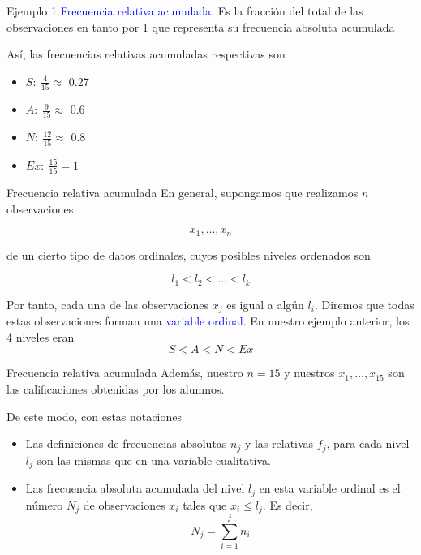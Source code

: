 \documentclass[
  ignorenonframetext,
  aspectratio=169]{beamer}
\providecommand{\tightlist}{%
  \setlength{\itemsep}{0pt}\setlength{\parskip}{0pt}}
\newcommand\blue[1]{\textcolor{blue}{#1}}
\begin{document}
\begin{frame}{Ejemplo 1}
\protect\hypertarget{ejemplo-1-3}{}
\blue{
Frecuencia relativa acumulada.
} Es la fracción del total de las observaciones en tanto por 1 que
representa su frecuencia absoluta acumulada

Así, las frecuencias relativas acumuladas respectivas son

\begin{itemize}
\tightlist
\item
  \(S:\ \frac{4}{15} \approx\) 0.27
\item
  \(A:\ \frac{9}{15}\approx\) 0.6
\item
  \(N:\ \frac{12}{15}\approx\) 0.8
\item
  \(Ex:\ \frac{15}{15}=1\)
\end{itemize}
\end{frame}

\begin{frame}{Frecuencia relativa acumulada}
\protect\hypertarget{frecuencia-relativa-acumulada}{}
En general, supongamos que realizamos \(n\) observaciones

\[x_1,\dots,x_n\]

de un cierto tipo de datos ordinales, cuyos posibles niveles ordenados
son

\[l_1<l_2<\dots<l_k\]

Por tanto, cada una de las observaciones \(x_j\) es igual a algún
\(l_i\). Diremos que todas estas observaciones forman una
\blue{variable ordinal}. En nuestro ejemplo anterior, los 4 niveles eran
\[S<A<N<Ex\]
\end{frame}

\begin{frame}{Frecuencia relativa acumulada}
\protect\hypertarget{frecuencia-relativa-acumulada-1}{}
Además, nuestro \(n = 15\) y nuestros \(x_1,\dots,x_{15}\) son las
calificaciones obtenidas por los alumnos.

De este modo, con estas notaciones

\begin{itemize}
\tightlist
\item
  Las definiciones de frecuencias absolutas \(n_j\) y las relativas
  \(f_j\), para cada nivel \(l_j\) son las mismas que en una variable
  cualitativa.
\item
  Las frecuencia absoluta acumulada del nivel \(l_j\) en esta variable
  ordinal es el número \(N_j\) de observaciones \(x_i\) tales que
  \(x_i\le l_j\). Es decir, \[N_j=\sum_{i=1}^jn_i\]
\end{itemize}
\end{frame}
\end{document}
